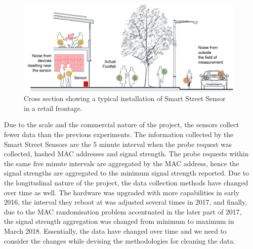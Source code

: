 \begin{figure}
  \includegraphics{images/sss.png}
  \caption{Cross section showing a typical installation of Smart Street Sensor in a retail frontage.}
  \label{figure:collection:sss:typical}
\end{figure}

Due to the scale and the commercial nature of the project, the sensors collect fewer data than the previous experiments.
The information collected by the Smart Street Sensors are the 5 minute interval when the probe request was collected, hashed MAC addresses and signal strength.
The probe requests within the same five minute intervals are aggregated by the MAC address, hence the signal strengths are aggregated to the minimum signal strength reported. 
Due to the longitudinal nature of the project, the data collection methods have changed over time as well.
The hardware was upgraded with more capabilities in early 2016, the interval they reboot at was adjusted several times in 2017, and finally, due to the MAC randomisation problem accentuated in the later part of 2017, the signal strength aggregation was changed from minimum to maximum in March 2018.
Essentially, the data have changed over time and we need to consider the changes while devising the methodologies for cleaning the data.
